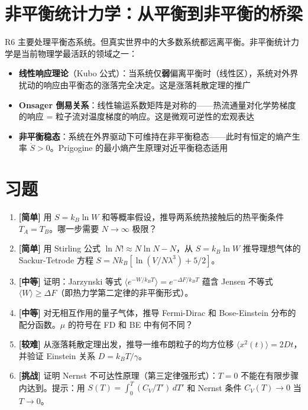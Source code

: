 \section{非平衡统计力学：从平衡到非平衡的桥梁}

R6 主要处理平衡态系统。但真实世界中的大多数系统都远离平衡。非平衡统计力学是当前物理学最活跃的领域之一：

\begin{itemize}
  \item \textbf{线性响应理论}（Kubo 公式）：当系统仅\textbf{弱}偏离平衡时（线性区），系统对外界扰动的响应由平衡态的涨落完全决定。这是涨落耗散定理的推广
  \item \textbf{Onsager 倒易关系}：线性输运系数矩阵是对称的——热流通量对化学势梯度的响应 = 粒子流对温度梯度的响应。这是微观可逆性的宏观表达
  \item \textbf{非平衡稳态}：系统在外界驱动下可维持在非平衡稳态——此时有恒定的熵产生率 $\dot{S} > 0$。Prigogine 的最小熵产生原理对近平衡稳态适用
\end{itemize}


\section*{习题}

\begin{enumerate}
  \item \textbf{[简单]} 用 $S = k_B\ln W$ 和等概率假设，推导两系统热接触后的热平衡条件 $T_A = T_B$。哪一步需要 $N\to\infty$ 极限？
  \item \textbf{[简单]} 用 Stirling 公式 $\ln N! \approx N\ln N - N$，从 $S = k_B\ln W$ 推导理想气体的 Sackur-Tetrode 方程 $S = Nk_B[\ln(V/N\lambda^3) + 5/2]$。
  \item \textbf{[中等]} 证明：Jarzynski 等式 $\langle e^{-W/k_BT}\rangle = e^{-\Delta F/k_BT}$ 蕴含 Jensen 不等式 $\langle W \rangle \ge \Delta F$（即热力学第二定律的非平衡形式）。
  \item \textbf{[中等]} 对无相互作用的量子气体，推导 Fermi-Dirac 和 Bose-Einstein 分布的配分函数。$\mu$ 的符号在 FD 和 BE 中有何不同？
  \item \textbf{[较难]} 从涨落耗散定理出发，推导一维布朗粒子的均方位移 $\langle x^2(t) \rangle = 2Dt$，并验证 Einstein 关系 $D = k_BT/\gamma$。
  \item \textbf{[挑战]} 证明 Nernst 不可达性原理（第三定律强形式）：$T=0$ 不能在有限步骤内达到。提示：用 $S(T) = \int_0^T (C_V/T')\,dT'$ 和 Nernst 条件 $C_V(T)\to 0$ 当 $T\to 0$。
\end{enumerate}
